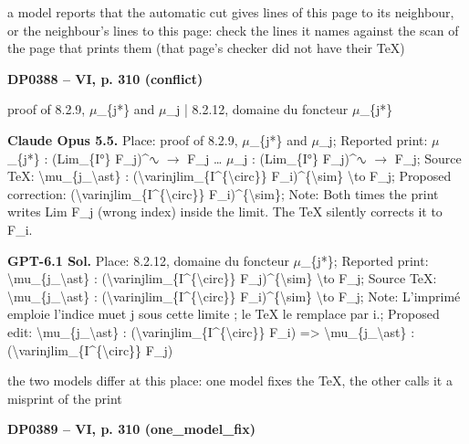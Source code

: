 a model reports that the automatic cut gives lines of this page to its neighbour, or the neighbour's lines to this page: check the lines it names against the scan of the page that prints them (that page's checker did not have their TeX)\par
\par\noindent\hypertarget{DP0388}{}\textbf{DP0388 -- VI, p. 310 (conflict)}\par
proof of 8.2.9, \ensuremath{\mu}\_\{j*\} and \ensuremath{\mu}\_j | 8.2.12, domaine du foncteur \ensuremath{\mu}\_\{j*\}\par
\textbf{Claude Opus 5.5.} Place: proof of 8.2.9, \ensuremath{\mu}\_\{j*\} and \ensuremath{\mu}\_j; Reported print: \ensuremath{\mu}\_\{j*\} : (Lim\_\{I°\} F\_j)\textasciicircum{}\ensuremath{∿} \ensuremath{\longrightarrow} F\_j … \ensuremath{\mu}\_j : (Lim\_\{I°\} F\_j)\textasciicircum{}\ensuremath{∿} \ensuremath{\longrightarrow} F\_j; Source TeX: \textbackslash{}mu\_\{j\_\textbackslash{}ast\} : (\textbackslash{}varinjlim\_\{I\textasciicircum{}\{\textbackslash{}circ\}\} F\_i)\textasciicircum{}\{\textbackslash{}sim\} \textbackslash{}to F\_j; Proposed correction: (\textbackslash{}varinjlim\_\{I\textasciicircum{}\{\textbackslash{}circ\}\} F\_i)\textasciicircum{}\{\textbackslash{}sim\}; Note: Both times the print writes Lim F\_j (wrong index) inside the limit. The TeX silently corrects it to F\_i.\par
\textbf{GPT-6.1 Sol.} Place: 8.2.12, domaine du foncteur \ensuremath{\mu}\_\{j*\}; Reported print: \textbackslash{}mu\_\{j\_\textbackslash{}ast\} : (\textbackslash{}varinjlim\_\{I\textasciicircum{}\{\textbackslash{}circ\}\} F\_j)\textasciicircum{}\{\textbackslash{}sim\} \textbackslash{}to F\_j; Source TeX: \textbackslash{}mu\_\{j\_\textbackslash{}ast\} : (\textbackslash{}varinjlim\_\{I\textasciicircum{}\{\textbackslash{}circ\}\} F\_i)\textasciicircum{}\{\textbackslash{}sim\} \textbackslash{}to F\_j; Note: L'imprimé emploie l'indice muet j sous cette limite ; le TeX le remplace par i.; Proposed edit: \textbackslash{}mu\_\{j\_\textbackslash{}ast\} : (\textbackslash{}varinjlim\_\{I\textasciicircum{}\{\textbackslash{}circ\}\} F\_i) =\allowbreak > \textbackslash{}mu\_\{j\_\textbackslash{}ast\} : (\textbackslash{}varinjlim\_\{I\textasciicircum{}\{\textbackslash{}circ\}\} F\_j)\par
the two models differ at this place: one model fixes the TeX, the other calls it a misprint of the print\par
\par\noindent\hypertarget{DP0389}{}\textbf{DP0389 -- VI, p. 310 (one\_model\_fix)}\par
